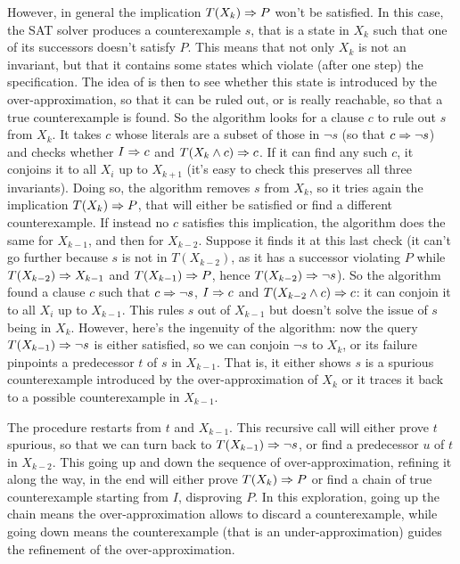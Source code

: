 However, in general the implication $T(X_k) \Rightarrow P$ won't be satisfied. In this case, the SAT solver produces a counterexample $s$, that is a state in $X_k$ such that one of its successors doesn't satisfy $P$. This means that not only $X_k$ is not an invariant, but that it contains some states which violate (after one step) the specification. The idea of  is then to see whether this state is introduced by the over-approximation, so that it can be ruled out, or is really reachable, so that a true counterexample is found.
So the algorithm looks for a clause $c$ to rule out $s$ from $X_k$. It takes $c$ whose literals are a subset of those in $\lnot s$ (so that $c \Rightarrow \lnot s$) and checks whether $I \Rightarrow c$ and $T(X_k \land c) \Rightarrow c$. If it can find any such $c$, it conjoins it to all $X_i$ up to $X_{k+1}$ (it's easy to check this preserves all three invariants). Doing so, the algorithm removes $s$ from $X_k$, so it tries again the implication $T(X_k) \Rightarrow P$, that will either be satisfied or find a different counterexample.
If instead no $c$ satisfies this implication, the algorithm does the same for $X_{k-1}$, and then for $X_{k-2}$. Suppose it finds it at this last check (it can't go further because $s$ is not in $T(X_{k-2})$, as it has a successor violating $P$ while $T(X_{k-2}) \Rightarrow X_{k-1}$ and $T(X_{k-1}) \Rightarrow P$, hence $T(X_{k-2}) \Rightarrow \lnot s$). So the algorithm found a clause $c$ such that $c \Rightarrow \lnot s$, $I \Rightarrow c$ and $T(X_{k-2} \land c) \Rightarrow c$: it can conjoin it to all $X_i$ up to $X_{k-1}$. This rules $s$ out of $X_{k-1}$ but doesn't solve the issue of $s$ being in $X_{k}$. However, here's the ingenuity of the algorithm: now the query $T(X_{k-1}) \Rightarrow \lnot s$ is either satisfied, so we can conjoin $\lnot s$ to $X_k$, or its failure pinpoints a predecessor $t$ of $s$ in $X_{k-1}$.
That is, it either shows $s$ is a spurious counterexample introduced by the over-approximation of $X_k$ or it traces it back to a possible counterexample in $X_{k-1}$.

The procedure restarts from $t$ and $X_{k-1}$. This recursive call will either prove $t$ spurious, so that we can turn back to $T(X_{k-1}) \Rightarrow \lnot s$, or find a predecessor $u$ of $t$ in $X_{k-2}$. This going up and down the sequence of over-approximation, refining it along the way, in the end will either prove $T(X_k) \Rightarrow P$ or find a chain of true counterexample starting from $I$, disproving $P$.
In this exploration, going up the chain means the over-approximation allows to discard a counterexample, while going down means the counterexample (that is an under-approximation) guides the refinement of the over-approximation.

